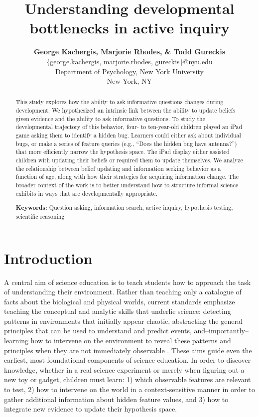 \documentclass[10pt,letterpaper]{article}
\title{Understanding developmental bottlenecks in active inquiry}
\author{
  {\large \bf George Kachergis, Marjorie Rhodes, \& Todd Gureckis} \\
  \{george.kachergis, marjorie.rhodes, gureckis\}@nyu.edu \\
  Department of Psychology, New York University \\
  New York, NY
}
\begin{document}
\maketitle

\begin{abstract}This study explores how the ability to ask informative questions changes during development. We hypothesized an intrinsic link between the ability to update beliefs given evidence and the ability to ask informative questions. To study the developmental trajectory of this behavior, four- to ten-year-old children played an iPad game asking them to identify a hidden bug. Learners could either ask about individual bugs, or make a series of feature queries (e.g., ``Does the hidden bug have antenna?'') that more efficiently narrow the hypothesis space. The iPad display either assisted children with updating their beliefs or required them to update themselves. We analyze the relationship between belief updating and information seeking behavior as a function of age, along with how their strategies for acquiring information change. The broader context of the work is to better understand how to structure informal science exhibits in ways that are developmentally appropriate.

\textbf{Keywords:} 
Question asking, information search, active inquiry, hypothesis testing, scientific reasoning
\end{abstract}


\section{Introduction} 


A central aim of science education is to teach students how to approach the task of understanding their environment. Rather than teaching only a catalogue of facts about the biological and physical worlds, current standards emphasize teaching the conceptual and analytic skills that underlie science: detecting patterns in environments that initially appear chaotic, abstracting the general principles that can be used to understand and predict events, and--importantly--learning how to intervene on the environment to reveal these patterns and principles when they are not immediately observable \cite{Bransford:2000,Donovan:2005,Duschl:2007}. These aims guide even the earliest, most foundational components of science education. In order to discover knowledge, whether in a real science experiment or merely when figuring out a new toy or gadget, children must learn: 1) which observable features are relevant to test, 2) how to intervene on the world in a context-sensitive manner in order to gather additional information about hidden feature values, and 3) how to integrate new evidence to update their hypothesis space.
\end{document}
